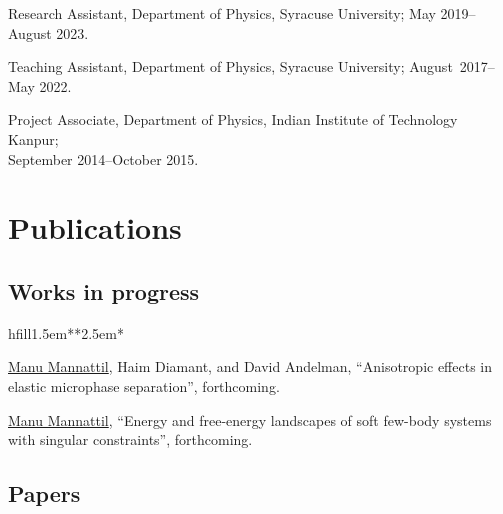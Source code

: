 \documentclass[10pt,article,oneside]{memoir}
\def\bname{\underline{Manu Mannattil}}    %
\begin{document}
Research Assistant, Department of Physics, Syracuse University; May 2019--August 2023.

Teaching Assistant, Department of Physics, Syracuse University; August~2017--May 2022.

Project Associate, Department of Physics, Indian Institute of Technology Kanpur;\\ September 2014--October 2015.


\section{Publications}

\subsection{Works in progress}

\begin{flexlabelled}{hfill}{1.5em}{*}{*}{2.5em}{*}
  \setlength{\itemsep}{-0.25em}
  \item[2.] {\bname}, Haim Diamant, and David Andelman, ``Anisotropic effects in elastic microphase separation'', forthcoming.
  \item[1.] {\bname}, ``Energy and free-energy landscapes of soft few-body systems with singular constraints'', forthcoming.
\end{flexlabelled}



\subsection{Papers}
\end{document}
